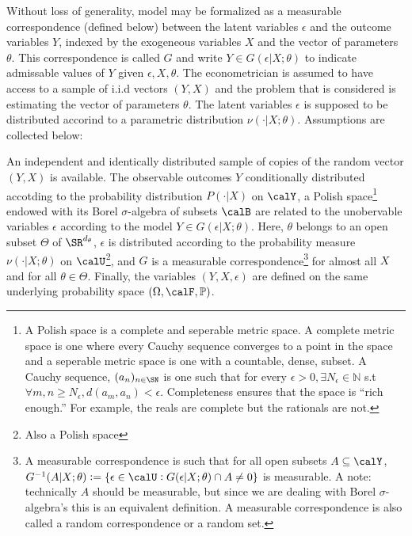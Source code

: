 Without loss of generality, model may be formalized as a measurable correspondence (defined below) between the latent variables $\epsilon$ and the outcome variables $Y$, indexed by the exogeneous variables $X$ and the vector of parameters $\theta$. This correspondence is called $G$ and write 
$Y\in G(\epsilon | X;\theta)$ to indicate admissable values of $Y$ given $\epsilon, X, \theta$. The econometrician is assumed to have access to a sample of i.i.d vectors $(Y,X)$ and the problem that is considered is estimating the vector of parameters $\theta$. The latent variables $\epsilon$ is supposed to be distributed accorind to a parametric distribution $\nu(\cdot|X;\theta)$. Assumptions are collected below:
\newpage
\begin{assumption}
	\label{assm:GK-1}
	An independent and identically distributed sample of copies of the random vector $(Y,X)$ is available. The observable outcomes $Y$ conditionally distributed accotding to the probability distribution $P(\cdot|X)$ on $\calY$, a Polish space\footnote{A Polish space is a complete and seperable metric space. A complete metric space is one where every Cauchy sequence converges to a point in the space and a seperable metric space is one with a countable, dense, subset. A Cauchy sequence, $(a_n)_{n\in \SN}$ is one such that for every $\epsilon > 0, \exists N_\epsilon \in \mathbb{N}$ s.t $\forall m,n \geq N_\epsilon, d(a_m, a_n) < \epsilon$. Completeness ensures that the space is ``rich enough.'' For example, the reals are complete but the rationals are not.}
	endowed with its Borel $\sigma$-algebra of subsets $\calB$ are related to the unobervable variables $\epsilon$ according to the model $Y\in G(\epsilon| X;\theta)$. Here, $\theta$ belongs to an open subset $\Theta$ of $\SR^{d_\theta}$, $\epsilon$ is distributed according to the probability measure $\nu(\cdot|X;\theta)$ on $\calU$\footnote{Also a Polish space}, 
	and $G$ is a measurable correspondence\footnote{A measurable correspondence is such that for all open subsets $A \subseteq \calY$, $G^{-1}(A|X;\theta) := \{\epsilon\in\calU: G(\epsilon|X;\theta) \cap A \neq 0\}$ is measurable. A note: technically $A$ should be measurable, but since we are dealing with Borel $\sigma$-algebra's this is an equivalent definition. A measurable correspondence is also called a random correspondence or a random set.}
	for almost all $X$ and for all $\theta \in \Theta$. Finally, the variables $(Y,X,\epsilon)$ are defined on the same underlying probability space $(\Omega, \calF, \mathbb{P})$. 
\end{assumption}

